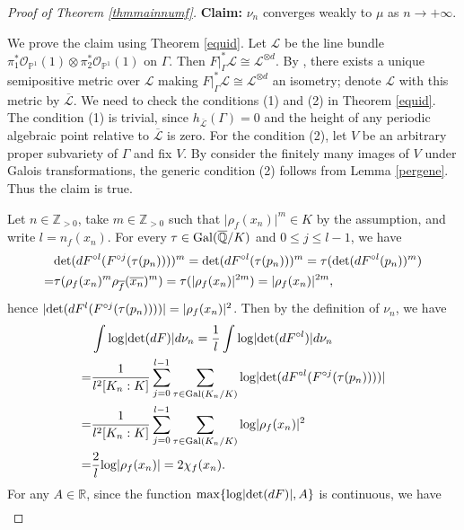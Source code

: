 \documentclass[12pt]{amsart}
\theoremstyle{plain}
\theoremstyle{remark}
\theoremstyle{definition}
\def\Z{\mathbb Z}
\def\Q{\mathbb Q}
\def\R{\mathbb R}
\def\P{\mathbb P}
\begin{document}
\begin{proof}[Proof of Theorem \ref{thmmainnumf}]
	
{\bfseries Claim:} $\nu_n$ converges weakly to $\mu$ as $n\to+\infty$.
	
	
We prove the claim using Theorem \ref{equid}. Let $\mathcal{L}$ be the line bundle $\pi_1^*\mathcal{O}_{\P^1}(1)\otimes\pi_2^*\mathcal{O}_{\P^1}(1)$ on $\Gamma$. Then $F\vert_{\Gamma}^*\mathcal{L}\cong\mathcal{L}^{\otimes d}$. By \cite{Zhang1995}, there exists a unique semipositive metric over $\mathcal{L}$ making $F\vert_{\Gamma}^*\mathcal{L}\cong\mathcal{L}^{\otimes d}$ an isometry; denote $\mathcal{L}$ with this metric by $\overline{\mathcal{L}}$. We need to check the conditions (1) and (2) in Theorem \ref{equid}. The condition (1) is trivial, since $h_{\overline{\mathcal{L}}}(\Gamma)=0$ and the height of any periodic algebraic point relative to $\overline{\mathcal{L}}$ is zero. For the condition (2), let $V$ be an arbitrary proper subvariety of $\Gamma$ and fix $V$. By consider the finitely many images of $V$ under Galois transformations, the generic condition (2) follows from Lemma \ref{pergene}. Thus the claim is true.\par
Let $n\in\Z_{>0}$, take $m\in\Z_{>0}$ such that $\lvert\rho_f(x_n)\rvert^m\in K$ by the assumption, and write $l=n_f(x_n)$. For every $\tau\in{\rm Gal}(\overline{\Q}/K)$ and $0\leq j\leq l-1$, we have\begin{align*}
		&{\rm det}(dF^{\circ l}(F^{\circ j}(\tau(p_n))))^m={\rm det}(dF^{\circ l}(\tau(p_n)))^m=\tau({\rm det}(dF^{\circ l}(p_n))^m)\\
		=&\tau(\rho_f(x_n)^m\rho_{\overline{f}}(\overline{x_n})^m)
		=\tau(\lvert \rho_f(x_n)\rvert^{2m})=\lvert \rho_f(x_n)\rvert^{2m},
\end{align*}hence $\lvert{\rm det}(dF^{l}(F^{\circ j}(\tau(p_n))))\rvert=\lvert \rho_f(x_n)\rvert^2$. Then by the definition of $\nu_n$, we have\begin{align*}
		&\int{\rm log}\lvert{\rm det}(dF)\rvert d\nu_n=\frac{1}{l}\int{\rm log}\lvert{\rm det}(dF^{\circ l})\rvert d\nu_n\\
		=&\frac{1}{l^2[K_n:K]}\sum_{j=0}^{l-1}\sum_{\tau\in{\rm Gal}(K_n/K)}{\rm log}\lvert{\rm det}(dF^{\circ l}(F^{\circ j}(\tau(p_n))))\rvert\\
		=&\frac{1}{l^2[K_n:K]}\sum_{j=0}^{l-1}\sum_{\tau\in{\rm Gal}(K_n/K)}{\rm log}\lvert \rho_f(x_n)\rvert^2\\
		=&\frac{2}{l}{\rm log}\lvert \rho_f(x_n)\rvert=2\chi_f(x_n).
	\end{align*}For any $A\in\R$, since the function ${\rm max}\{{\rm log}\lvert{\rm det}(dF)\rvert,A\}$ is continuous, we have\begin{align*}

\end{align*}
\end{proof}
\end{document}
